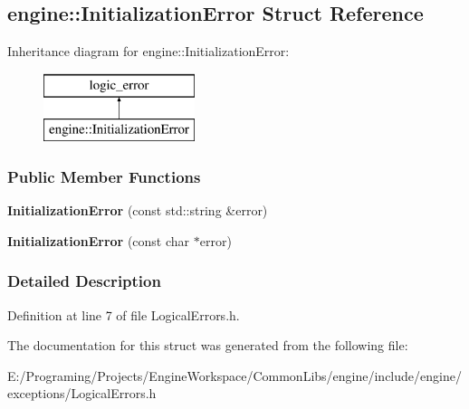 \hypertarget{a00048}{}\subsection{engine\+:\+:Initialization\+Error Struct Reference}
\label{a00048}
Inheritance diagram for engine\+:\+:Initialization\+Error\+:\begin{figure}[H]
\begin{center}
\leavevmode
\includegraphics[height=2.000000cm]{a00048}
\end{center}
\end{figure}
\subsubsection*{Public Member Functions}
\begin{DoxyCompactItemize}
\item 
{\bfseries Initialization\+Error} (const std\+::string \&error)\hypertarget{a00048_a7292c661ed6737cf6a041176398e9893}{}\label{a00048_a7292c661ed6737cf6a041176398e9893}

\item 
{\bfseries Initialization\+Error} (const char $\ast$error)\hypertarget{a00048_a4313a4d837f17721d89740f940042eb2}{}\label{a00048_a4313a4d837f17721d89740f940042eb2}

\end{DoxyCompactItemize}


\subsubsection{Detailed Description}


Definition at line 7 of file Logical\+Errors.\+h.



The documentation for this struct was generated from the following file\+:\begin{DoxyCompactItemize}
\item 
E\+:/\+Programing/\+Projects/\+Engine\+Workspace/\+Common\+Libs/engine/include/engine/exceptions/Logical\+Errors.\+h\end{DoxyCompactItemize}
